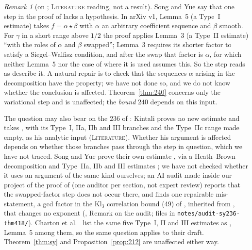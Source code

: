 \documentclass[11pt]{amsart}
\theoremstyle{definition}
\theoremstyle{remark}
\newtheorem{remark}[theorem]{Remark}
\newcommand{\lbl}[1]{\textup{\textsc{#1}}}
\begin{document}
\begin{remark}[on {\cite[Lemma~5]{Sta26}}; \lbl{Literature} reading, not a result]\label{rem:lemma5}
Song and Yue \cite[Remark~4.23]{SY26} say that one step in the proof of
\cite[Lemma~5]{Sta26} lacks a hypothesis. In arXiv v1, Lemma~5 (a Type~I
estimate) takes $f=\alpha\star\beta$ with $\alpha$ an arbitrary
coefficient sequence and $\beta$ smooth. For $\gamma$ in a short range above
$1/2$ the proof applies Lemma~3 (a Type~II estimate) ``with the roles of
$\alpha$ and $\beta$ swapped''; Lemma~3 requires its shorter factor to satisfy
a Siegel--Walfisz condition, and after the swap that factor is $\alpha$, for
which neither Lemma~5 nor the case of \cite[Definition~9]{Sta26} where it is
used assumes this. So the step reads as \cite{SY26} describe it. A natural
repair is to check that the sequences $\alpha$ arising in the decomposition
have the property; we have not done so, and we do not know whether the
conclusion is affected. Theorem~\ref{thm:240} concerns only the variational
step and is unaffected; the \emph{bound} $240$ depends on this input.

The question may also bear on the $236$ of \cite{Kin26}: Kintali proves no
new estimate and takes \cite[Prop.~3]{Sta26}, with its Type~I, IIa, IIb and
III branches and the Type~IIc range made empty, as his analytic input
(\lbl{Literature}). Whether his argument is affected depends on whether those
branches pass through the step in question, which we have not traced. Song
and Yue prove their own estimate \cite[Thm.~4.18]{SY26}, via a Heath--Brown
decomposition and Type~IIa, IIb and III estimates
\cite[\S\S4.2--4.7]{SY26}; we have not checked whether it uses an argument of
the same kind ourselves; an AI audit made inside our project of the proof
of \cite[Thm.~4.18]{SY26} (one auditor per section, not expert review) reports
that the swapped-factor step does not occur there, and finds one repairable
mis-statement, a gcd factor in the $\mathrm{Kl}_3$ correlation bound (49) of
\cite{SY26}, inherited from \cite[Lemma~6.25]{PM8a}, that changes no exponent
(\cite{Kim26}, Remark on the audit; files in
\texttt{notes/}\allowbreak\texttt{audit-sy236-thm418/}). Charton et al.\ \cite{Cha26} list the same five Type~I, II and
III estimates as \cite{Sta26}, Lemma~5 among them, so the same question
applies to their draft. Theorem~\ref{thm:sy} and
Proposition~\ref{prop:212} are unaffected either way.
\end{remark}
\end{document}
